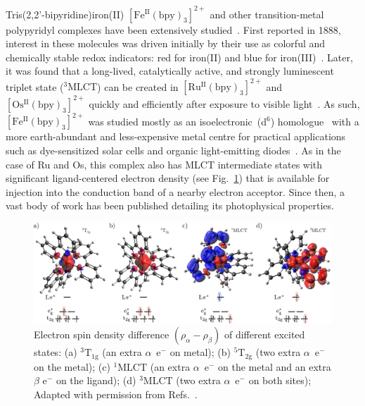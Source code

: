 Tris(2,2'-bipyridine)iron(II) $\mathrm{[Fe^{II}(bpy)_3]^{2+}}$
and other transition-metal polypyridyl complexes have been
extensively studied~\cite{Hauser2017, McCusker2019}.
%
First reported in 1888, interest in these molecules was driven initially
by their use as colorful and chemically stable redox indicators:
red for iron(II) and blue for iron(III)~\cite{Brandt1954}.
%
Later, it was found that a long-lived, catalytically active,
and strongly luminescent triplet state ($\mathrm{^3 MLCT}$)
can be created in $\mathrm{[Ru^{II}(bpy)_3]^{2+}}$ and
$\mathrm{[Os^{II}(bpy)_3]^{2+}}$ quickly and efficiently
after exposure to visible light~\cite{Thompson2013}.
%
As such, $\mathrm{[Fe^{II}(bpy)_3]^{2+}}$ was studied mostly
as an isoelectronic~(d$^6$) homologue~\cite{Chen2018, Wenger2018}
with a more earth-abundant and less-expensive metal centre
for practical applications such as dye-sensitized solar cells
and organic light-emitting diodes~\cite{Weber2013, Ponseca2017, Bizzarri2018}.
%
As in the case of Ru and Os, this complex also has MLCT intermediate states
with significant ligand-centered electron density (see Fig.~\ref{fig: BPY-intro})
that is available for injection into the conduction band of a nearby electron acceptor.
%
Since then, a vast body of work has been published
detailing its photophysical properties.
%
\begin{figure}[t!]
  \centering
  \includegraphics[width = \textwidth]{Figures/fig_BPY_intro.pdf}
  \caption[Electron spin density difference of different excited states.]{
    Electron spin density difference $(\rho_\alpha - \rho_\beta)$
    of different excited states:
    (a) $\mathrm{^3 T_{1g}}$ (an extra $\alpha$~e$^-$ on metal);
    (b) $\mathrm{^5 T_{2g}}$ (two extra $\alpha$~e$^-$ on the metal);
    (c) $\mathrm{^1 MLCT}$ (an extra $\alpha$~e$^-$ on the metal
    and an extra $\beta$ e$^-$ on the ligand);
    (d) $\mathrm{^3 MLCT}$ (two extra $\alpha$~e$^-$ on both sites);
    Adapted with permission from Refs.~\cite{Sousa2013, Zhang2018}.
  }
  \label{fig: BPY-intro}
\end{figure}

